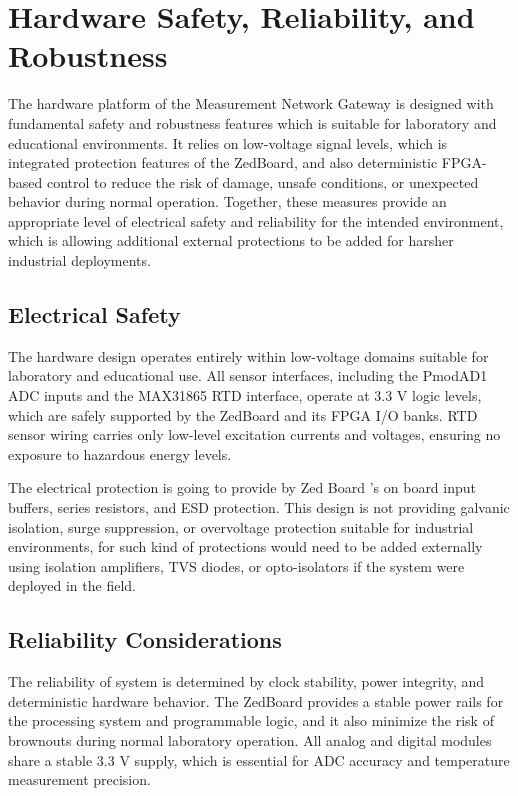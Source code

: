 \section{Hardware Safety, Reliability, and Robustness}
The hardware platform of the Measurement Network Gateway is designed with fundamental safety and robustness features which is suitable for laboratory and educational environments. It relies on low-voltage signal levels, which is integrated protection features of the ZedBoard, and also deterministic FPGA-based control to reduce the risk of damage, unsafe conditions, or unexpected behavior during normal operation. Together, these measures provide an appropriate level of electrical safety and reliability for the intended environment, which is allowing additional external protections to be added for harsher industrial deployments.

\subsection{Electrical Safety}
The hardware design operates entirely within low-voltage domains suitable for laboratory and educational use. All sensor interfaces, including the PmodAD1 ADC inputs and the MAX31865 RTD interface, operate at 3.3 V logic levels, which are safely supported by the ZedBoard and its FPGA I/O banks. RTD sensor wiring carries only low-level excitation currents and voltages, ensuring no exposure to hazardous energy levels.

The electrical protection is going to provide by Zed Board ’s on board input buffers, series resistors, and ESD protection. This design is not providing  galvanic isolation, surge suppression, or overvoltage protection suitable for industrial environments, for such kind of protections would need to be added externally using isolation amplifiers, TVS diodes, or opto-isolators if the system were deployed in the field. 

\subsection{Reliability Considerations}
The reliability of system is determined by  clock stability, power integrity, and deterministic hardware behavior. The ZedBoard provides a stable power rails for the processing system and programmable logic, and it also minimize the risk of brownouts during normal laboratory operation. All analog and digital modules share a stable 3.3 V supply, which is essential for ADC accuracy and temperature measurement precision.

